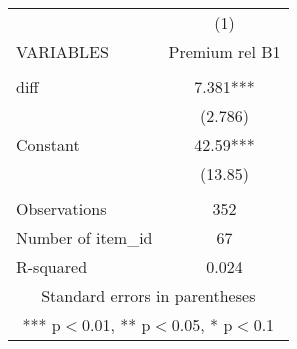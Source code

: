 \documentclass[]{article}
\begin{document}
\begin{tabular}{lc} \hline
 & (1) \\
VARIABLES & Premium rel B1 \\ \hline
 &  \\
diff & 7.381*** \\
 & (2.786) \\
Constant & 42.59*** \\
 & (13.85) \\
 &  \\
Observations & 352 \\
Number of item\_id & 67 \\
 R-squared & 0.024 \\ \hline
\multicolumn{2}{c}{ Standard errors in parentheses} \\
\multicolumn{2}{c}{ *** p$<$0.01, ** p$<$0.05, * p$<$0.1} \\
\end{tabular}
\end{document}
